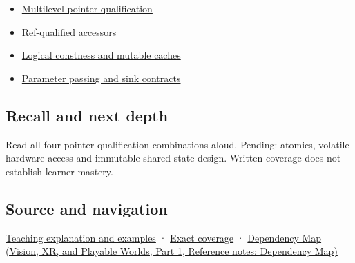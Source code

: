 \begin{itemize}
\tightlist
\item
  \hyperref[appendix-5e1a7561cd98]{Multilevel pointer qualification}
\item
  \hyperref[appendix-d42039b1d6f7]{Ref-qualified accessors}
\item
  \hyperref[appendix-f5593256bcaf]{Logical constness and mutable caches}
\item
  \hyperref[appendix-d5908f75721f]{Parameter passing and sink contracts}
\end{itemize}

\subsection{Recall and next depth}\label{appendix-c25d60fed375-recall-and-next-depth}

\hypertarget{appendix-c25d60fed375-recall-and-next-depth}{}

Read all four pointer-qualification combinations aloud. Pending: atomics, volatile hardware access and immutable shared-state design. Written coverage does not establish learner mastery.

\subsection{Source and navigation}\label{appendix-c25d60fed375-source-and-navigation}

\hypertarget{appendix-c25d60fed375-source-and-navigation}{}

\hyperref[01-foundations-i-ch003-read-only-is-a-path-not-an-ownership-or-synchronization-promise]{Teaching explanation and examples} · \hyperref[appendix-fd090d982a15-m008---parts-113-126]{Exact coverage} · \href{../07-Vision-XR-and-Playable-Worlds-P01/main.pdf\#nameddest=appendix-4ad47bdd269a}{Dependency Map (Vision, XR, and Playable Worlds, Part 1, Reference notes: Dependency Map)}
